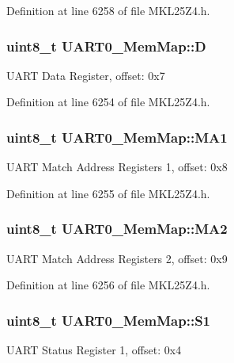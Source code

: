 Definition at line 6258 of file M\+K\+L25\+Z4.\+h.

\subsubsection[{\texorpdfstring{D}{D}}]{\setlength{\rightskip}{0pt plus 5cm}uint8\+\_\+t U\+A\+R\+T0\+\_\+\+Mem\+Map\+::D}\hypertarget{struct_u_a_r_t0___mem_map_a9ed4a4e4a34f425d3b625106eff08700}{}\label{struct_u_a_r_t0___mem_map_a9ed4a4e4a34f425d3b625106eff08700}
U\+A\+RT Data Register, offset\+: 0x7 

Definition at line 6254 of file M\+K\+L25\+Z4.\+h.

\subsubsection[{\texorpdfstring{M\+A1}{MA1}}]{\setlength{\rightskip}{0pt plus 5cm}uint8\+\_\+t U\+A\+R\+T0\+\_\+\+Mem\+Map\+::\+M\+A1}\hypertarget{struct_u_a_r_t0___mem_map_a84dcf3f91ccba87c62fdbf25264ee660}{}\label{struct_u_a_r_t0___mem_map_a84dcf3f91ccba87c62fdbf25264ee660}
U\+A\+RT Match Address Registers 1, offset\+: 0x8 

Definition at line 6255 of file M\+K\+L25\+Z4.\+h.

\subsubsection[{\texorpdfstring{M\+A2}{MA2}}]{\setlength{\rightskip}{0pt plus 5cm}uint8\+\_\+t U\+A\+R\+T0\+\_\+\+Mem\+Map\+::\+M\+A2}\hypertarget{struct_u_a_r_t0___mem_map_a13b6861472650bfda5bd6843fde687a4}{}\label{struct_u_a_r_t0___mem_map_a13b6861472650bfda5bd6843fde687a4}
U\+A\+RT Match Address Registers 2, offset\+: 0x9 

Definition at line 6256 of file M\+K\+L25\+Z4.\+h.

\subsubsection[{\texorpdfstring{S1}{S1}}]{\setlength{\rightskip}{0pt plus 5cm}uint8\+\_\+t U\+A\+R\+T0\+\_\+\+Mem\+Map\+::\+S1}\hypertarget{struct_u_a_r_t0___mem_map_ac4cfda6527bfad520a55ddeb3d70d669}{}\label{struct_u_a_r_t0___mem_map_ac4cfda6527bfad520a55ddeb3d70d669}
U\+A\+RT Status Register 1, offset\+: 0x4 

